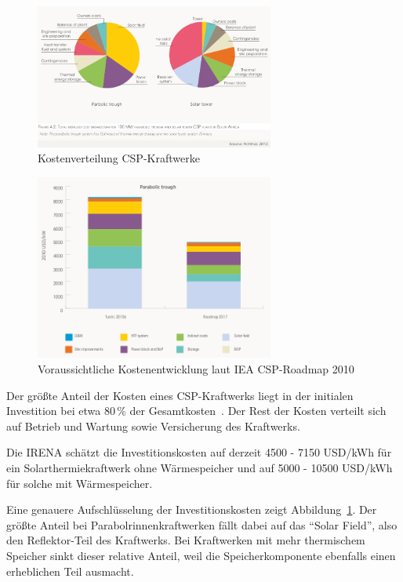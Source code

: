 \begin{figure}[H]
	\centering
	\includegraphics[width=0.7\textwidth,trim=1 1 1 1,clip]{kostenverteilung.png}
	\caption{Kostenverteilung CSP-Kraftwerke}
	\label{fig:kostenverteilung}
\end{figure}

\begin{figure}[H]
	\centering
	\includegraphics[width=0.7\textwidth,trim=1 1 1 1,clip]{kostenentwicklung1.png}
	\caption{Voraussichtliche Kostenentwicklung laut IEA CSP-Roadmap 2010}
	\label{fig:kostenentwicklung1}
\end{figure}

Der größte Anteil der Kosten eines CSP-Kraftwerks liegt in der initialen Investition bei etwa 80\,\% der Gesamtkosten~\cite{irena2012}. Der Rest der Kosten verteilt sich auf Betrieb und Wartung sowie Versicherung des Kraftwerks.

Die IRENA schätzt die Investitionskosten auf derzeit 4500 - 7150 USD/kWh für ein Solarthermiekraftwerk ohne Wärmespeicher und auf 5000 - 10500 USD/kWh für solche mit Wärmespeicher.

Eine genauere Aufschlüsselung der Investitionskosten zeigt Abbildung~\ref{fig:kostenverteilung}. Der größte Anteil bei Parabolrinnenkraftwerken fällt dabei auf das "`Solar Field"', also den Reflektor-Teil des Kraftwerks. Bei Kraftwerken mit mehr thermischem Speicher sinkt dieser relative Anteil, weil die Speicherkomponente ebenfalls einen erheblichen Teil ausmacht.

